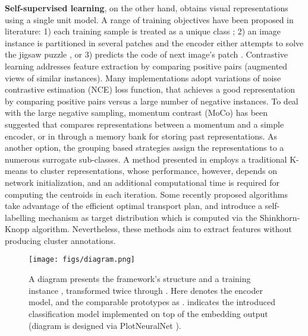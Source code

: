 \documentclass[journal]{IEEEtran}
\begin{document}
\textbf{Self-supervised learning}, on the other hand, obtains visual representations using a single unit model. A range of training objectives have been proposed in literature: 1)  each training sample is treated as a unique class \cite{DBLP:journals/pami/DosovitskiyFSRB16}; 2) an image instance is partitioned in several patches and the encoder either attempts to solve the jigsaw puzzle \cite{10.1007/978-3-319-46466-4_5}, or 3) predicts the code of next image's patch \cite{2018arXiv180703748V}. Contrastive learning addresses feature extraction by comparing positive pairs (augmented views of similar instances). Many implementations \cite{caron2020unsupervised,pmlr-v119-chen20j,He_2020_CVPR,2018arXiv180703748V, DBLP:journals/ijcv/ZhaoXWWTL20} adopt variations of noise contrastive estimation (NCE) \cite{pmlr-v9-gutmann10a} loss function, that achieves a good representation by comparing positive pairs versus a large number of negative instances. To deal with the large negative sampling, momentum contrast (MoCo) \cite{He_2020_CVPR} has been suggested that compares representations between a momentum and a simple encoder, or in \cite{DBLP:journals/ijcv/ZhaoXWWTL20} through a memory bank for storing past representations. As another option, the grouping based strategies \cite{asano2020self,caron2018deep,caron2020unsupervised} assign the representations to a numerous surrogate sub-classes. A method presented in \cite{caron2018deep} employs a traditional K-means to cluster representations, whose performance, however, depends on network initialization, and an additional computational time is required for computing the centroids in each iteration. Some recently proposed algorithms \cite{asano2020self,caron2020unsupervised} take advantage of the efficient optimal transport plan, and introduce a self-labelling mechanism as target distribution which is computed via the Shinkhorn-Knopp \cite{NIPS2013_af21d0c9} algorithm. Nevertheless, these methods aim to extract features without producing cluster annotations.


\begin{figure*}[t]
    \centering
    \texttt{[image: figs/diagram.png]}
    \caption{A diagram presents the framework's structure and a training instance , transformed twice through . Here  denotes the encoder model, and the comparable prototypes as .  indicates the introduced classification model implemented on top of the embedding output (diagram is designed via PlotNeuralNet \cite{haris_iqbal_2018_2526396}).}
    \label{fig:framework}
\end{figure*}
\end{document}
